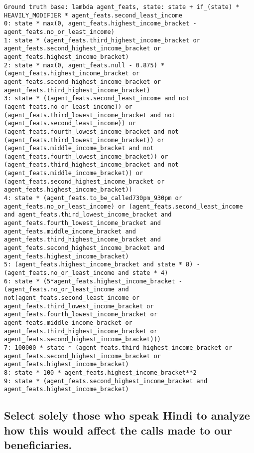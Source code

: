 \begin{lstlisting}
Ground truth base: lambda agent_feats, state: state + if_(state) * HEAVILY_MODIFIER * agent_feats.second_least_income
0: state * max(0, agent_feats.highest_income_bracket - agent_feats.no_or_least_income) 
1: state * (agent_feats.third_highest_income_bracket or agent_feats.second_highest_income_bracket or agent_feats.highest_income_bracket) 
2: state * max(0, agent_feats.null - 0.875) * (agent_feats.highest_income_bracket or agent_feats.second_highest_income_bracket or agent_feats.third_highest_income_bracket) 
3: state * ((agent_feats.second_least_income and not (agent_feats.no_or_least_income)) or (agent_feats.third_lowest_income_bracket and not (agent_feats.second_least_income)) or (agent_feats.fourth_lowest_income_bracket and not (agent_feats.third_lowest_income_bracket)) or (agent_feats.middle_income_bracket and not (agent_feats.fourth_lowest_income_bracket)) or (agent_feats.third_highest_income_bracket and not (agent_feats.middle_income_bracket)) or (agent_feats.second_highest_income_bracket or agent_feats.highest_income_bracket)) 
4: state * (agent_feats.to_be_called730pm_930pm or agent_feats.no_or_least_income) or (agent_feats.second_least_income and agent_feats.third_lowest_income_bracket and agent_feats.fourth_lowest_income_bracket and agent_feats.middle_income_bracket and agent_feats.third_highest_income_bracket and agent_feats.second_highest_income_bracket and agent_feats.highest_income_bracket) 
5: (agent_feats.highest_income_bracket and state * 8) - (agent_feats.no_or_least_income and state * 4) 
6: state * (5*agent_feats.highest_income_bracket - (agent_feats.no_or_least_income and not(agent_feats.second_least_income or agent_feats.third_lowest_income_bracket or agent_feats.fourth_lowest_income_bracket or agent_feats.middle_income_bracket or agent_feats.third_highest_income_bracket or agent_feats.second_highest_income_bracket))) 
7: 100000 * state * (agent_feats.third_highest_income_bracket or agent_feats.second_highest_income_bracket or agent_feats.highest_income_bracket) 
8: state * 100 * agent_feats.highest_income_bracket**2 
9: state * (agent_feats.second_highest_income_bracket and agent_feats.highest_income_bracket) 

\end{lstlisting}
\subsection{Select solely those who speak Hindi to analyze how this would affect the calls made to our beneficiaries.}


